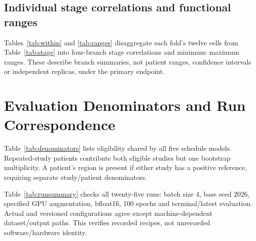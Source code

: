 \documentclass[mathematics,article,submit,pdftex,moreauthors]{Definitions/mdpi}
\begin{document}
\subsection{Individual stage correlations and functional ranges}
Tables~\ref{tab:within} and \ref{tab:ranges} disaggregate each fold's twelve
cells from Table~\ref{tab:stage} into four-branch stage correlations and
minimum--maximum ranges. These describe branch summaries, not patient ranges,
confidence intervals or independent replicas, under the primary endpoint.
{\small}
{\footnotesize\setlength{\tabcolsep}{2pt}

}

\section{Evaluation Denominators and Run Correspondence}\label{app:reporting}
Table~\ref{tab:denominators} lists eligibility shared by all five schedule
models. Repeated-study patients contribute both eligible studies but one
bootstrap multiplicity. A patient's region is present if either study has
a positive reference, requiring separate study/patient denominators.
\begin{table}[H]
\caption{Evaluation studies/patients and positive-reference region
denominators, common to all five schedule-study models.}
\label{tab:denominators}
\centering\small\setlength{\tabcolsep}{3pt}

\end{table}

Table~\ref{tab:runsummary} checks all twenty-five runs: batch size 4, base seed
2026, specified GPU augmentation, bfloat16, 100 epochs and terminal/latest
evaluation. Actual and versioned configurations agree except machine-dependent
dataset/output paths. This verifies recorded recipes, not unrecorded
software/hardware identity.
\begin{table}[H]
\caption{Recorded schedule-study run correspondence. Terminal epoch is
one-based; the evaluation JSON records zero-based epoch 99. Differences
compare each run with its own source configuration, preserving the intended
architecture differences between families.}
\label{tab:runsummary}
\centering\small
\end{table}
\end{document}
